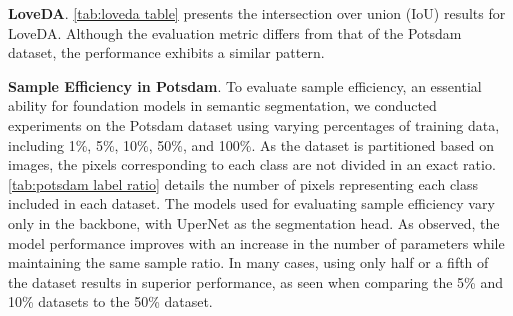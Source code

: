 \textbf{LoveDA}. \autoref{tab:loveda table} presents the intersection over union (IoU) results for LoveDA. Although the evaluation metric differs from that of the Potsdam dataset, the performance exhibits a similar pattern.


\textbf{Sample Efficiency in Potsdam}. To evaluate sample efficiency, an essential ability for foundation models in semantic segmentation, we conducted experiments on the Potsdam dataset using varying percentages of training data, including 1\%, 5\%, 10\%, 50\%, and 100\%. As the dataset is partitioned based on images, the pixels corresponding to each class are not divided in an exact ratio. \autoref{tab:potsdam label ratio} details the number of pixels representing each class included in each dataset. The models used for evaluating sample efficiency vary only in the backbone, with UperNet as the segmentation head. As observed, the model performance improves with an increase in the number of parameters while maintaining the same sample ratio. In many cases, using only half or a fifth of the dataset results in superior performance, as seen when comparing the 5\% and 10\% datasets to the 50\% dataset.